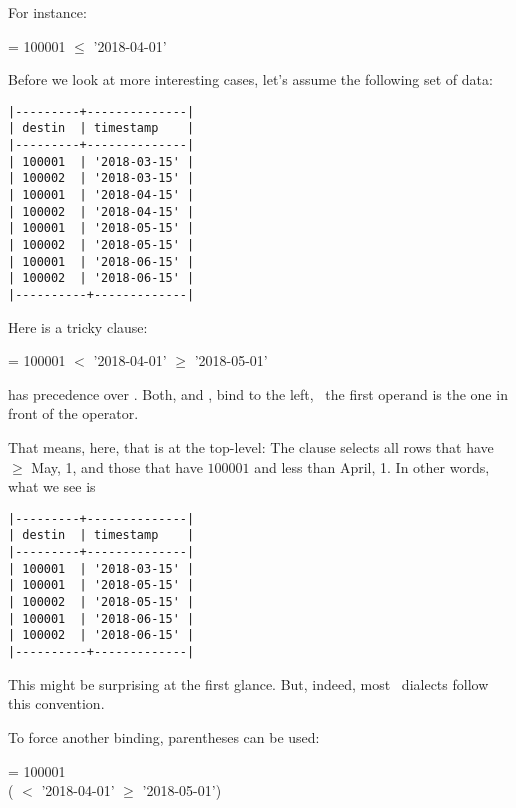 For instance:

  = 100001
  $\le$ '2018-04-01'

Before we look at more interesting cases,
let's assume the following set of data:

\begin{minipage}{\textwidth}
\begin{verbatim}
|---------+--------------|
| destin  | timestamp    |
|---------+--------------|
| 100001  | '2018-03-15' |
| 100002  | '2018-03-15' |
| 100001  | '2018-04-15' |
| 100002  | '2018-04-15' |
| 100001  | '2018-05-15' |
| 100002  | '2018-05-15' |
| 100001  | '2018-06-15' |
| 100002  | '2018-06-15' |
|----------+-------------|
\end{verbatim}
\end{minipage}

Here is a tricky  clause:

  = 100001
  $<$ '2018-04-01'
  $\ge$ '2018-05-01'

 has precedence over .
Both,  and , bind to the left,
\ie\ the first operand is the one in front of the operator.

That means, here, that  is at the top-level:
The clause selects all rows that have 
$\ge$ May, 1, and those that have  $100001$
and  less than April, 1.
In other words, what we see is

\begin{minipage}{\textwidth}
\begin{verbatim}
|---------+--------------|
| destin  | timestamp    |
|---------+--------------|
| 100001  | '2018-03-15' |
| 100001  | '2018-05-15' |
| 100002  | '2018-05-15' |
| 100001  | '2018-06-15' |
| 100002  | '2018-06-15' |
|----------+-------------|
\end{verbatim}
\end{minipage}

This might be surprising at the first glance.
But, indeed, most \sql\ dialects follow this convention.

To force another binding, parentheses can be used:

\begin{minipage}{\textwidth}
  = 100001 \\
\hspace*{0.45cm} ( $<$ '2018-04-01'
  $\ge$ '2018-05-01')
\end{minipage}

